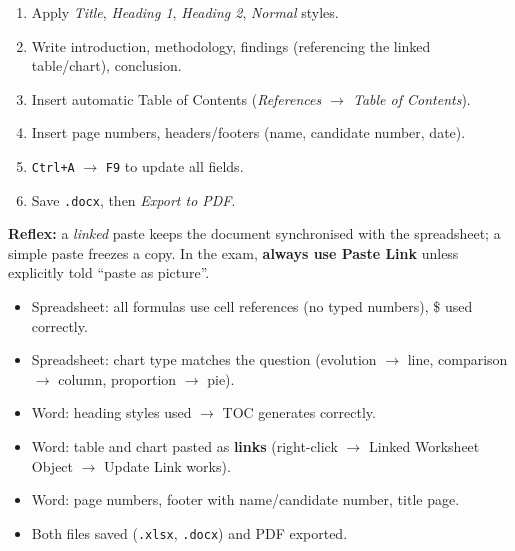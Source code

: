 \documentclass[11pt]{article}
\begin{document}
\begin{methode}
\begin{enumerate}
\begin{enumerate}
\item Apply \emph{Title}, \emph{Heading 1}, \emph{Heading 2}, \emph{Normal} styles.
\item Write introduction, methodology, findings (referencing the linked table/chart), conclusion.
\item Insert automatic Table of Contents (\emph{References $\rightarrow$ Table of Contents}).
\item Insert page numbers, headers/footers (name, candidate number, date).
\item \texttt{Ctrl+A} $\rightarrow$ \texttt{F9} to update all fields.
\item Save \texttt{.docx}, then \emph{Export to PDF}.
\end{enumerate}
\end{enumerate}
\textbf{Reflex:} a \emph{linked} paste keeps the document synchronised with the spreadsheet; a simple paste freezes a copy. In the exam, \textbf{always use Paste Link} unless explicitly told ``paste as picture''.
\end{methode}

\begin{aretenir}
\begin{itemize}
\item[$\square$] Spreadsheet: all formulas use cell references (no typed numbers), \$ used correctly.
\item[$\square$] Spreadsheet: chart type matches the question (evolution $\rightarrow$ line, comparison $\rightarrow$ column, proportion $\rightarrow$ pie).
\item[$\square$] Word: heading styles used $\rightarrow$ TOC generates correctly.
\item[$\square$] Word: table and chart pasted as \textbf{links} (right-click $\rightarrow$ Linked Worksheet Object $\rightarrow$ Update Link works).
\item[$\square$] Word: page numbers, footer with name/candidate number, title page.
\item[$\square$] Both files saved (\texttt{.xlsx}, \texttt{.docx}) and PDF exported.
\end{itemize}
\end{aretenir}
\end{document}
